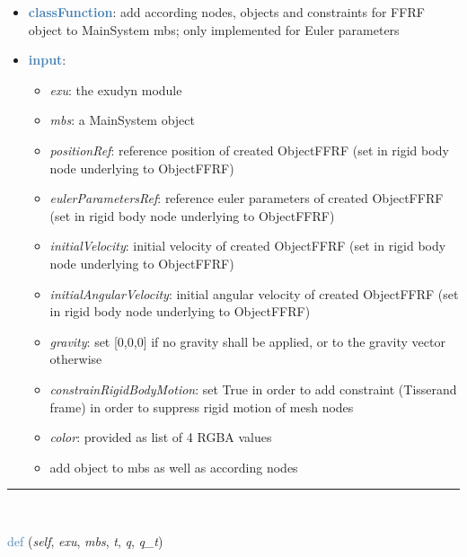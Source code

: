 \begin{itemize}[leftmargin=1.4cm]
\begin{itemize}[leftmargin=1.4cm]
\begin{itemize}[leftmargin=1.4cm]
\begin{itemize}[leftmargin=0.5cm]
\begin{itemize}[leftmargin=1.4cm]
\begin{itemize}[leftmargin=1.4cm]
\begin{itemize}[leftmargin=1.4cm]
\begin{itemize}[leftmargin=0.5cm]
\begin{flushleft}
\end{flushleft}
\setlength{\itemindent}{0.7cm}
\begin{itemize}[leftmargin=0.7cm]
\item[--]\textcolor{steelblue}{\bf classFunction}: add according nodes, objects and constraints for FFRF object to MainSystem mbs; only implemented for Euler parameters
\item[--]\textcolor{steelblue}{\bf input}: \vspace{-6pt}
\begin{itemize}[leftmargin=1.2cm]
\setlength{\itemindent}{-0.7cm}
\item[]{\it exu}: the exudyn module
\item[]{\it mbs}: a MainSystem object
\item[]{\it positionRef}: reference position of created ObjectFFRF (set in rigid body node underlying to ObjectFFRF)
\item[]{\it eulerParametersRef}: reference euler parameters of created ObjectFFRF (set in rigid body node underlying to ObjectFFRF)
\item[]{\it initialVelocity}: initial velocity of created ObjectFFRF (set in rigid body node underlying to ObjectFFRF)
\item[]{\it initialAngularVelocity}: initial angular velocity of created ObjectFFRF (set in rigid body node underlying to ObjectFFRF)
\item[]{\it gravity}: set [0,0,0] if no gravity shall be applied, or to the gravity vector otherwise
\item[]{\it constrainRigidBodyMotion}: set True in order to add constraint (Tisserand frame) in order to suppress rigid motion of mesh nodes
\item[]{\it color}: provided as list of 4 RGBA values
\item[]add object to mbs as well as according nodes
\end{itemize}
\vspace{12pt}\end{itemize}
%
\noindent\rule{8cm}{0.75pt}\vspace{1pt} \\ 
\begin{flushleft}
\noindent \textcolor{steelblue}{def {\bf {}}}\label{sec:FEM:ObjectFFRFinterface:UFforce}
({\it self}, {\it exu}, {\it mbs}, {\it t}, {\it q}, {\it q\_t})
\end{flushleft}
\setlength{\itemindent}{0.7cm}

\end{itemize}
\end{itemize}
\end{itemize}
\end{itemize}
\end{itemize}
\end{itemize}
\end{itemize}
\end{itemize}
